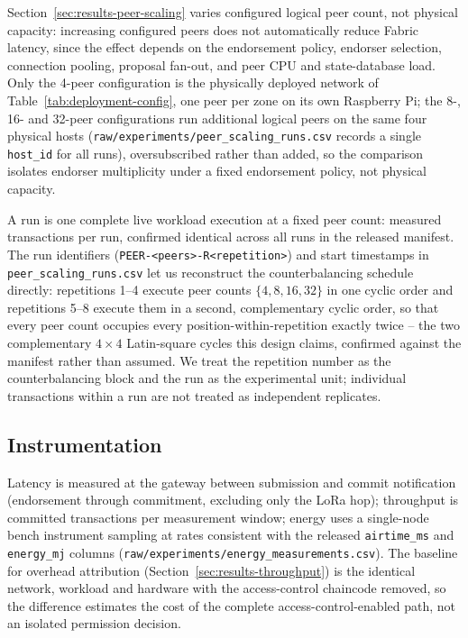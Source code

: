 Section~\ref{sec:results-peer-scaling} varies configured logical peer count, not physical capacity: increasing configured peers does not automatically reduce Fabric latency, since the effect depends on the endorsement policy, endorser selection, connection pooling, proposal fan-out, and peer CPU and state-database load. Only the 4-peer configuration is the physically deployed network of Table~\ref{tab:deployment-config}, one peer per zone on its own Raspberry Pi; the 8-, 16- and 32-peer configurations run additional logical peers on the same four physical hosts (\texttt{raw/experiments/peer\_scaling\_runs.csv} records a single \texttt{host\_id} for all \PeerRunsTotal{} runs), oversubscribed rather than added, so the comparison isolates endorser multiplicity under a fixed endorsement policy, not physical capacity.

A run is one complete live workload execution at a fixed peer count: \PeerTxPerRun{} measured transactions per run, confirmed identical across all \PeerRunsTotal{} runs in the released manifest. The run identifiers (\texttt{PEER-<peers>-R<repetition>}) and start timestamps in \texttt{peer\_scaling\_runs.csv} let us reconstruct the counterbalancing schedule directly: repetitions 1--4 execute peer counts $\{4,8,16,32\}$ in one cyclic order and repetitions 5--8 execute them in a second, complementary cyclic order, so that every peer count occupies every position-within-repetition exactly twice -- the two complementary $4\times4$ Latin-square cycles this design claims, confirmed against the manifest rather than assumed. We treat the repetition number as the counterbalancing block and the run as the experimental unit; individual transactions within a run are not treated as independent replicates.

\subsection{Instrumentation}

Latency is measured at the gateway between submission and commit notification (endorsement through commitment, excluding only the LoRa hop); throughput is committed transactions per measurement window; energy uses a single-node bench instrument sampling at rates consistent with the released \texttt{airtime\_ms} and \texttt{energy\_mj} columns (\texttt{raw/experiments/energy\_measurements.csv}). The baseline for overhead attribution (Section~\ref{sec:results-throughput}) is the identical network, workload and hardware with the access-control chaincode removed, so the difference estimates the cost of the complete access-control-enabled path, not an isolated permission decision.

